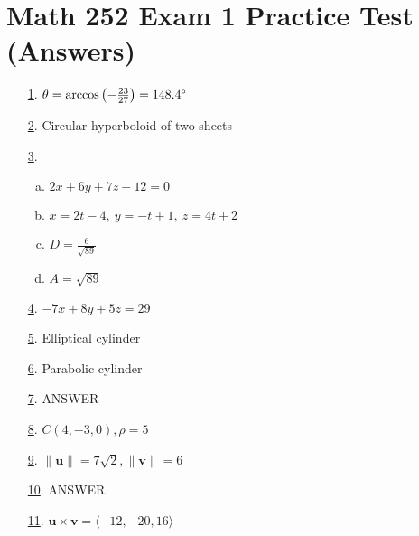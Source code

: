 \documentclass[fleqn]{article}
\renewcommand{\vec}[1]{\mathbf{#1}}
\begin{document}
\section*{Math 252 Exam 1 Practice Test (Answers)}
\begin{itemize}

\item[\hyperlink{1-problem}{1}.]\hypertarget{1-answer}{}$\theta=\arccos\left(-\frac{23}{27}\right)=148.4\degree$
\smallskip

\item[\hyperlink{2-problem}{2}.]\hypertarget{2-answer}{}Circular hyperboloid of two sheets
\smallskip

\item[\hyperlink{3-problem}{3}.]\hypertarget{3-answer}{}\begin{enumerate}[a.]
  \item \(2x+6y+7z-12=0\)
  \item \(x=2t-4,\ y=-t+1,\ z=4t+2\)
  \item \(D=\frac{6}{\sqrt{89}}\)
  \item \(A=\sqrt{89}\)
\end{enumerate}
\smallskip

\item[\hyperlink{4-problem}{4}.]\hypertarget{4-answer}{}$-7x+8y+5z=29$
\smallskip

\item[\hyperlink{5-problem}{5}.]\hypertarget{5-answer}{}Elliptical cylinder
\smallskip

\item[\hyperlink{6-problem}{6}.]\hypertarget{6-answer}{}Parabolic cylinder
\smallskip

\item[\hyperlink{7-problem}{7}.]\hypertarget{7-answer}{}ANSWER
\smallskip

\item[\hyperlink{8-problem}{8}.]\hypertarget{8-answer}{}$C(4,-3,0),\rho=5$
\smallskip

\item[\hyperlink{9-problem}{9}.]\hypertarget{9-answer}{}$\|\mathbf u\|=7\sqrt 2,\|\mathbf v\|=6$
\smallskip

\item[\hyperlink{10-problem}{10}.]\hypertarget{10-answer}{}ANSWER
\smallskip

\item[\hyperlink{11-problem}{11}.]\hypertarget{11-answer}{}$\vec u\times\vec v=\langle -12,-20,16\rangle$
\smallskip


\end{itemize}
\end{document}
